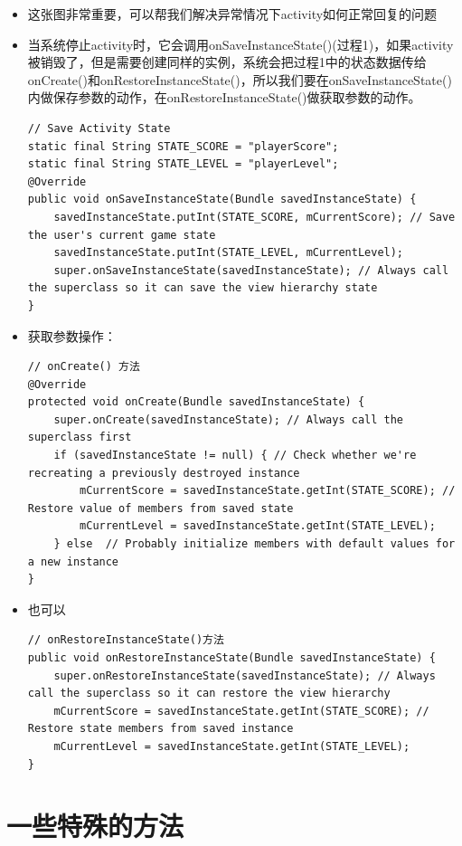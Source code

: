\documentclass[9pt, b5paaper]{book}
\begin{document}
\begin{itemize}
\item 这张图非常重要，可以帮我们解决异常情况下activity如何正常回复的问题
\item 当系统停止activity时，它会调用onSaveInstanceState()(过程1)，如果activity被销毁了，但是需要创建同样的实例，系统会把过程1中的状态数据传给onCreate()和onRestoreInstanceState()，所以我们要在onSaveInstanceState()内做保存参数的动作，在onRestoreInstanceState()做获取参数的动作。
\begin{verbatim}
// Save Activity State
static final String STATE_SCORE = "playerScore";
static final String STATE_LEVEL = "playerLevel";
@Override
public void onSaveInstanceState(Bundle savedInstanceState) {
    savedInstanceState.putInt(STATE_SCORE, mCurrentScore); // Save the user's current game state
    savedInstanceState.putInt(STATE_LEVEL, mCurrentLevel);
    super.onSaveInstanceState(savedInstanceState); // Always call the superclass so it can save the view hierarchy state
}
\end{verbatim}
\item 获取参数操作：
\begin{verbatim}
// onCreate() 方法
@Override
protected void onCreate(Bundle savedInstanceState) {
    super.onCreate(savedInstanceState); // Always call the superclass first
    if (savedInstanceState != null) { // Check whether we're recreating a previously destroyed instance
        mCurrentScore = savedInstanceState.getInt(STATE_SCORE); // Restore value of members from saved state
        mCurrentLevel = savedInstanceState.getInt(STATE_LEVEL);
    } else  // Probably initialize members with default values for a new instance
}
\end{verbatim}
\item 也可以
\begin{verbatim}
// onRestoreInstanceState()方法
public void onRestoreInstanceState(Bundle savedInstanceState) {
    super.onRestoreInstanceState(savedInstanceState); // Always call the superclass so it can restore the view hierarchy
    mCurrentScore = savedInstanceState.getInt(STATE_SCORE); // Restore state members from saved instance
    mCurrentLevel = savedInstanceState.getInt(STATE_LEVEL);
}
\end{verbatim}
\end{itemize}

\section{一些特殊的方法}
\label{sec-1-3}
\end{document}
